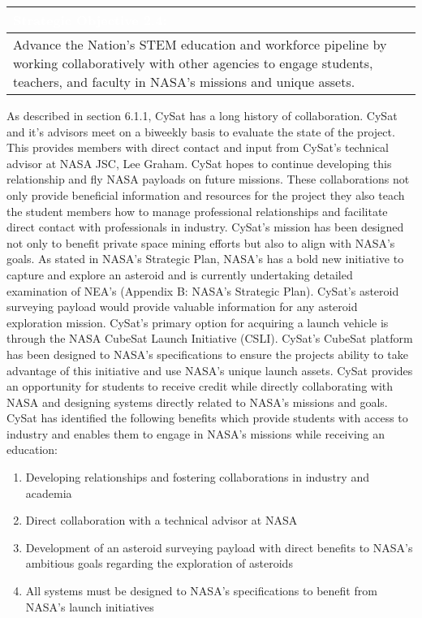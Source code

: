 \documentclass[nocover]            %
{CSLI}                       %
\begin{document}
\begin{table}[H]
\centering
\begin{tabular}{| p{\textwidth} |}
\arrayrulecolor{white}
\hline
\rowcolor{gray!80}
\textcolor{white}{\textbf{Strategic Objective 2.4: }} \\ \hline
\rowcolor{gray!10}
Advance the Nation's STEM education and workforce pipeline by working collaboratively with other agencies to engage students, teachers, and faculty in NASA's missions and unique assets.\\ \hline
\end{tabular}
\end{table}
As described in section 6.1.1, CySat has a long history of collaboration. CySat and it's advisors meet on a biweekly basis to evaluate the state of the project. This provides members with direct contact and input from CySat's technical advisor at NASA JSC, Lee Graham. CySat hopes to continue developing this relationship and fly NASA payloads on future missions. These collaborations not only provide beneficial information and resources for the project they also teach the student members how to manage professional relationships and facilitate direct contact with professionals in industry. CySat's mission has been designed not only to benefit private space mining efforts but also to align with NASA's goals. As stated in NASA's Strategic Plan, NASA's has a bold new initiative to capture and explore an asteroid and is currently undertaking detailed examination of NEA's (Appendix B: NASA's Strategic Plan). CySat's asteroid surveying payload would provide valuable information for any asteroid exploration mission. CySat's primary option for acquiring a launch vehicle is through the NASA CubeSat Launch Initiative (CSLI). CySat's CubeSat platform has been designed to NASA's specifications to ensure the projects ability to take advantage of this initiative and use NASA's unique launch assets. CySat provides an opportunity for students to receive credit while directly collaborating with NASA and designing systems directly related to NASA's missions and goals.\\
\indent CySat has identified the following benefits which provide students with access to industry and enables them to engage in NASA's missions while receiving an education:
\begin{enumerate}
\item{Developing relationships and fostering collaborations in industry and academia}
\item{Direct collaboration with a technical advisor at NASA}
\item{Development of an asteroid surveying payload with direct benefits to NASA's ambitious goals regarding the exploration of asteroids}
\item{All systems must be designed to NASA's specifications to benefit from NASA's launch initiatives}
\end {enumerate}
\end{document}
